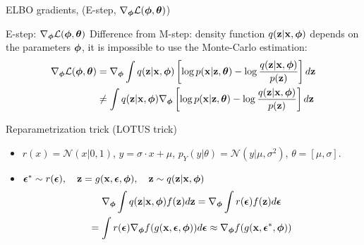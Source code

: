 \begin{frame}{ELBO gradients, (E-step, $\nabla_{\boldsymbol{\phi}} \mathcal{L}(\boldsymbol{\phi}, \boldsymbol{\theta})$)}
	\begin{block}{E-step: $\nabla_{\boldsymbol{\phi}} \mathcal{L}(\boldsymbol{\phi}, \boldsymbol{\theta})$}
		Difference from M-step: density function $q(\mathbf{z}| \mathbf{x}, \boldsymbol{\phi})$ depends on the parameters $\boldsymbol{\phi}$, it is impossible to use the Monte-Carlo estimation:
		\begin{align*}
			\nabla_{\boldsymbol{\phi}} \mathcal{L} (\boldsymbol{\phi}, \boldsymbol{\theta}) &= \nabla_{\boldsymbol{\phi}} \int q(\mathbf{z} | \mathbf{x}, \boldsymbol{\phi}) \left[\log p(\mathbf{x} | \mathbf{z}, \boldsymbol{\theta}) - \log \frac{q(\mathbf{z}| \mathbf{x}, \boldsymbol{\phi})}{p(\mathbf{z})} \right] d \mathbf{z} \\
			& \neq  \int q(\mathbf{z} | \mathbf{x}, \boldsymbol{\phi}) \nabla_{\boldsymbol{\phi}} \left[\log p(\mathbf{x} | \mathbf{z}, \boldsymbol{\theta}) - \log \frac{q(\mathbf{z}| \mathbf{x}, \boldsymbol{\phi})}{p(\mathbf{z})} \right] d \mathbf{z} 
		\end{align*}
	\end{block}
	\vspace{-0.5cm}
	\begin{block}{Reparametrization trick (LOTUS trick)} 
		\begin{itemize}
			\item $r(x) = \mathcal{N}(x|0, 1)$, $y = \sigma \cdot x + \mu$, $p_Y(y|\theta) = \mathcal{N}(y| \mu, \sigma^2)$, $\theta = [\mu, \sigma]$.
			
			\item $\boldsymbol{\epsilon}^* \sim r(\boldsymbol{\epsilon}), \quad \mathbf{z} = g(\mathbf{x}, \boldsymbol{\epsilon}, \boldsymbol{\phi}), \quad \mathbf{z} \sim q(\mathbf{z} | \mathbf{x}, \boldsymbol{\phi})$
			\vspace{-0.3cm}
			\begin{multline*}
				\nabla_{\boldsymbol{\phi}}\int q(\mathbf{z}|\mathbf{x}, \boldsymbol{\phi}) f(\mathbf{z}) d\mathbf{z} = \nabla_{\boldsymbol{\phi}}\int r(\boldsymbol{\epsilon})  f(\mathbf{z}) d\boldsymbol{\epsilon} \\ = \int r(\boldsymbol{\epsilon}) \nabla_{\boldsymbol{\phi}} f(g(\mathbf{x}, \boldsymbol{\epsilon}, \boldsymbol{\phi})) d\boldsymbol{\epsilon} \approx \nabla_{\boldsymbol{\phi}} f(g(\mathbf{x}, \boldsymbol{\epsilon}^*, \boldsymbol{\phi}))
			\end{multline*}
		\end{itemize}
	\end{block}
\end{frame}
